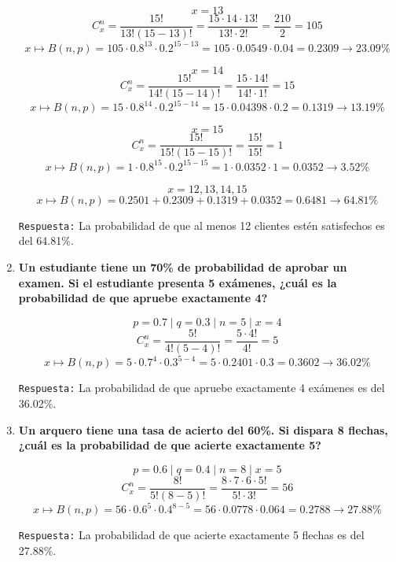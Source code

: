 \documentclass[12pt]{article}
\begin{document}
\begin{enumerate}[label=\textbf{\arabic*.}]
            \[x = 13\]
            \[C^{n}_{x} = \frac{15!}{13!(15-13)!} = \frac{15\cdot 14\cdot 13!}{13!\cdot 2!} = \frac{210}{2} = 105\]
            \[x \mapsto B(n, p) = 105 \cdot 0.8^{13} \cdot 0.2^{15-13} = 105 \cdot 0.0549 \cdot 0.04 = 0.2309 \rightarrow 23.09\%\]

            \[x = 14\]
            \[C^{n}_{x} = \frac{15!}{14!(15-14)!} = \frac{15\cdot 14!}{14!\cdot 1!} = 15\]
            \[x \mapsto B(n, p) = 15 \cdot 0.8^{14} \cdot 0.2^{15-14} = 15 \cdot 0.04398 \cdot 0.2 = 0.1319 \rightarrow 13.19\%\]

            \[x = 15\]
            \[C^{n}_{x} = \frac{15!}{15!(15-15)!} = \frac{15!}{15!} = 1\]
            \[x \mapsto B(n, p) = 1 \cdot 0.8^{15} \cdot 0.2^{15-15} = 1 \cdot 0.0352 \cdot 1 = 0.0352 \rightarrow 3.52\%\]

            \[x = 12, 13, 14, 15\]
            \[x \mapsto B(n, p) = 0.2501 + 0.2309 + 0.1319 + 0.0352 = 0.6481 \rightarrow 64.81\%\]
            
            \texttt{Respuesta:} La probabilidad de que al menos 12 clientes estén satisfechos es del 64.81\%.


        \item \textbf{Un estudiante tiene un 70\% de probabilidad de aprobar un examen. Si el estudiante
        presenta 5 exámenes, ¿cuál es la probabilidad de que apruebe exactamente 4?}

            \[p = 0.7 \mid q = 0.3 \mid n = 5 \mid x = 4\]
            \[C^{n}_{x} = \frac{5!}{4!(5-4)!} = \frac{5\cdot 4!}{4!} = 5\]
            \[x \mapsto B(n, p) = 5 \cdot 0.7^{4} \cdot 0.3^{5-4} = 5 \cdot 0.2401 \cdot 0.3 = 0.3602 \rightarrow 36.02\%\]

            \texttt{Respuesta:} La probabilidad de que apruebe exactamente 4 exámenes es del 36.02\%.
        
        \item \textbf{Un arquero tiene una tasa de acierto del 60\%. Si dispara 8 flechas, ¿cuál es la
        probabilidad de que acierte exactamente 5?}

        \[p = 0.6 \mid q = 0.4 \mid n = 8 \mid x = 5\]
            \[C^{n}_{x} = \frac{8!}{5!(8-5)!} = \frac{8\cdot 7\cdot 6\cdot 5!}{5!\cdot 3!} = 56\]
            \[x \mapsto B(n, p) = 56 \cdot 0.6^{5} \cdot 0.4^{8-5} = 56 \cdot 0.0778 \cdot 0.064 = 0.2788 \rightarrow 27.88\%\]

            \texttt{Respuesta:} La probabilidad de que acierte exactamente 5 flechas es del 27.88\%.

    \end{enumerate}
\end{document}
